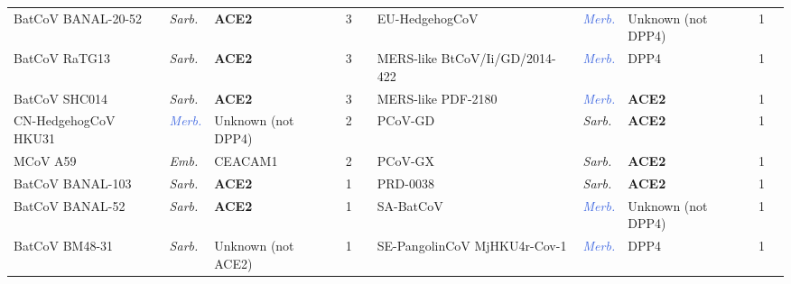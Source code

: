 \begin{table}[htbp]
\begin{tabular}{lllrclllrc}
BatCoV BANAL-20-52    & \textit{\textcolor{BrickRed}{Sarb.}} & \textbf{ACE2}               & 3     & \cite{temmam2022}   & EU-HedgehogCoV                 & \textit{\textcolor{RoyalBlue}{Merb.}} & Unknown (not DPP4)      & 1     & \cite{yuan2025}       \\
BatCoV RaTG13         & \textit{\textcolor{BrickRed}{Sarb.}} & \textbf{ACE2}               & 3     & \cite{wrobel2020, zhang2024}     & MERS-like BtCoV/Ii/GD/2014-422 & \textit{\textcolor{RoyalBlue}{Merb.}} & DPP4                    & 1     & \cite{yuan2025}                                                                       \\
BatCoV SHC014         & \textit{\textcolor{BrickRed}{Sarb.}} & \textbf{ACE2}               & 3     & \cite{letko2020} & MERS-like PDF-2180             & \textit{\textcolor{RoyalBlue}{Merb.}} & \textbf{ACE2}                    & 1     & \cite{xiong2022}      \\
CN-HedgehogCoV HKU31  & \textit{\textcolor{RoyalBlue}{Merb.}} & Unknown (not DPP4) & 2     & \cite{yuan2025}     & PCoV-GD                        & \textit{\textcolor{BrickRed}{Sarb.}} & \textbf{ACE2}                    & 1     & \cite{nie2021}      \\
MCoV A59              & \textit{\textcolor{OliveGreen}{Emb.}}  & CEACAM1             & 2     & \cite{wang2021}          & PCoV-GX                        & \textit{\textcolor{BrickRed}{Sarb.}} & \textbf{ACE2}                    & 1     & \cite{nie2021}      \\
BatCoV BANAL-103      & \textit{\textcolor{BrickRed}{Sarb.}} & \textbf{ACE2}               & 1     & \cite{temmam2022}   & PRD-0038                       & \textit{\textcolor{BrickRed}{Sarb.}} & \textbf{ACE2}                    & 1     & \cite{lee2023}      \\
BatCoV BANAL-52       & \textit{\textcolor{BrickRed}{Sarb.}} & \textbf{ACE2}               & 1     & \cite{temmam2022}   & SA-BatCoV                      & \textit{\textcolor{RoyalBlue}{Merb.}} & Unknown (not DPP4)      & 1     & \cite{yuan2025}          \\
BatCoV BM48-31        & \textit{\textcolor{BrickRed}{Sarb.}} & Unknown (not ACE2)           & 1     & \cite{starr2022, su2024}        & SE-PangolinCoV MjHKU4r-Cov-1   & \textit{\textcolor{RoyalBlue}{Merb.}} & DPP4                    & 1     &     \cite{yuan2025}  \\
\bottomrule
\end{tabular}
\label{table:bcov3d_counts}
\end{table}
\setlength{\tabcolsep}{6pt}